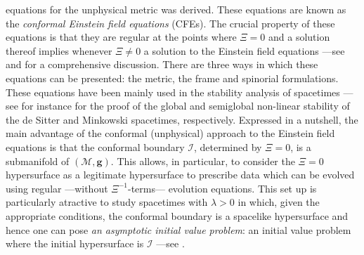 \documentclass[10pt,a4paper]{article}
\theoremstyle{plain}
\def\bmg{{\bm g}}
\begin{document}
equations for the unphysical metric was derived. These equations are
known as the \emph{conformal Einstein field equations} (CFEs).  The crucial
property of these equations is that they are regular at the points
where $\Xi=0$ and a solution thereof implies whenever $\Xi\neq 0$ a
solution to the Einstein field equations ---see \cite{Fri81a,Fri83}
and \cite{CFEbook} for a comprehensive discussion.  There are three
ways in which these equations can be presented: the metric, the frame
and spinorial formulations. These equations have been mainly used in
the stability analysis of spacetimes ---see for instance \cite{Fri86b,
  Fri86c} for the proof of the global and semiglobal non-linear
stability of the de Sitter and Minkowski spacetimes, respectively.
Expressed in a nutshell, the main advantage of the conformal
(unphysical) approach to the Einstein field equations is that the
conformal boundary $\mathscr{I}$, determined by $\Xi=0$, is a
submanifold of $(\mathcal{M},\bmg)$. This allows, in particular, to
consider the $\Xi=0$ hypersurface as a legitimate hypersurface to
prescribe data which can be evolved using regular ---without
$\Xi^{-1}$-terms--- evolution equations. 
This set up is particularly atractive to study
spacetimes with $\lambda>0$ in which, given the appropriate
conditions, the conformal boundary is a spacelike
hypersurface and hence one can pose \emph{an asymptotic initial value
problem}: an initial value problem where the initial hypersurface is
$\mathscr{I}$ ---see \cite{GasVal17,MarPaeSenSim16, LueVal09}.

\medskip
\end{document}
